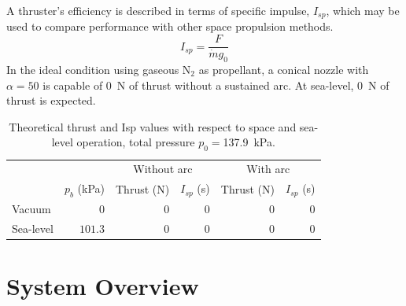 \documentclass[journal]{IEEEtran}
\begin{document}
 A thruster's efficiency is described in terms of specific impulse, $I_{sp}$, which may be used to compare performance with other space propulsion methods.
 \begin{equation}
 \label{eq:isp}
   I_{sp}=\frac{F}{\dot{m} g_0}
 \end{equation}
In the ideal condition using gaseous N$_2$ as propellant, a conical nozzle with $\alpha=50$ is capable of \SI{0}{\newton} of thrust without a sustained arc.
At sea-level, \SI{0}{\newton} of thrust is expected.

\begin{table}[hbp]
  \caption{Theoretical thrust and Isp values with respect to space and sea-level operation, total pressure $p_0= $\SI{137.9}{\kilo\pascal}.
\label{tab:theoretical-performance}
}
  \begin{tabular}{lrrrrr}
    \toprule
    & & \multicolumn{2}{c}{Without arc} & \multicolumn{2}{c}{With arc} \\
    & $p_b$ (\si{\kilo\pascal}) & Thrust (\si{\newton}) & $I_{sp}$ (\si{\second}) & Thrust (\si{\newton}) & $I_{sp}$ (\si{\second}) \\
    \midrule
    Vacuum & $0$ & $0$ & $0$ & $0$ & $0$ \\
    Sea-level & $101.3$ & $0$ & $0$ & $0$ & $0$  \\
    \bottomrule
  \end{tabular}
\end{table}

\section{System Overview}
\end{document}
